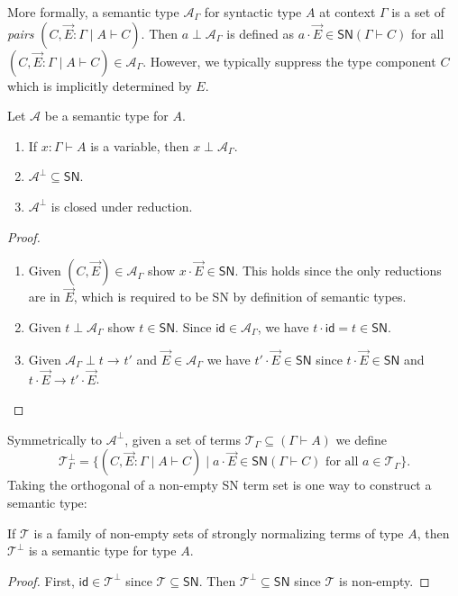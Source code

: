 \documentclass[a4paper,USenglish,cleveref, autoref, thm-restate]{lipics-v2019}
\newcommand{\bla}{\ensuremath{\mbox{$$}}}
\newcommand{\tid}{\mathsf{id}}
\newcommand{\red}[1][]{\longrightarrow_{#1}}
\newcommand{\A}{\mathcal{A}}
\newcommand{\T}{\mathcal{T}}
\newcommand{\SN}{\mathsf{SN}}
\begin{document}
More formally, a semantic type $\A_\Gamma$ for syntactic type $A$ at
context $\Gamma$ is a set of \emph{pairs}
$(C, \vec E : \Gamma \mid A \vdash C)$.
Then $a \perp \A_\Gamma$ is defined as
$a \cdot \vec E \in \SN(\Gamma \vdash C)$
for all $(C, \vec E : \Gamma \mid A \vdash C) \in \A_\Gamma$.
However, we typically
suppress the type component $C$ which is implicitly determined by $E$.
\begin{lemma}
  Let $\A$ be a semantic type for $A$.
  \begin{enumerate}
  \item If $x : \Gamma \vdash A$ is a variable, then $x \perp
    \A_\Gamma$.
  \item $\A^\perp \subseteq \SN$.
  \item $\A^\perp$ is closed under reduction.
  \end{enumerate}
\end{lemma}
\begin{proof} \bla
  \begin{enumerate}
  \item Given $(C, \vec E) \in \A_\Gamma$ show $x \cdot \vec E \in
    \SN$.  This holds since the only reductions are in $\vec E$, which
    is required to be SN by definition of semantic types.

  \item Given $t \perp \A_\Gamma$ show $t \in \SN$.
   Since $\tid \in \A_\Gamma$, we have $t \cdot \tid = t \in \SN$.

  \item Given $\A_\Gamma \perp t \red t'$ and $\vec E \in \A_\Gamma$ we
    have $t' \cdot \vec E \in \SN$ since $t \cdot \vec E \in \SN$ and
    $t \cdot \vec E \red t' \cdot \vec E$.
  \end{enumerate}
\end{proof}

\noindent
Symmetrically to $\A^\perp$, given a set of terms $\T_\Gamma \subseteq
(\Gamma \vdash A)$ we define
\[
  \T_\Gamma^\perp =
  \{ (C, \vec E : \Gamma \mid A \vdash C) \mid
  a \cdot \vec E \in \SN(\Gamma \vdash C)
  \mbox{ for all } a \in \T_\Gamma \}
  .
\]
Taking the orthogonal of a non-empty SN term set is one way to
construct a semantic type:
\begin{lemma}
  \label{lem:orthsem}
  If $\T$ is a family of non-empty sets of strongly normalizing terms
  of type $A$, then
  $\T^\perp$ is a semantic type for type $A$.
\end{lemma}
\begin{proof}
  First, $\tid \in \T^\perp$ since $\T \subseteq \SN$.
  Then $\T^\perp \subseteq \SN$ since $\T$ is non-empty.
\end{proof}
\end{document}
